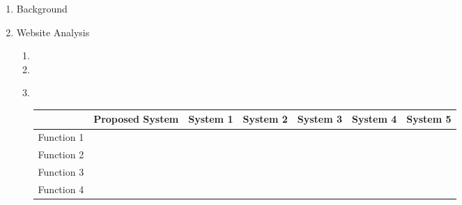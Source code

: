 \documentclass[12pt]{article}%
\begin{document}
\begin{enumerate}

    \item Background
    \item Website Analysis
        \begin{enumerate}
            \item 
            \item 
            \item \hspace{1cm} \\
            \begin{tabular}{|l|l|l|l|l|l|l|}
                \hline
                 & Proposed System & System 1 & System 2 & System 3 & System 4 & System 5 \\
                 \hline
                Function 1 & \\
                Function 2 & \\
                Function 3 & \\
                Function 4 & \\
                 \hline
            \end{tabular}
        \end{enumerate}

    
\end{enumerate}

\end{document}
